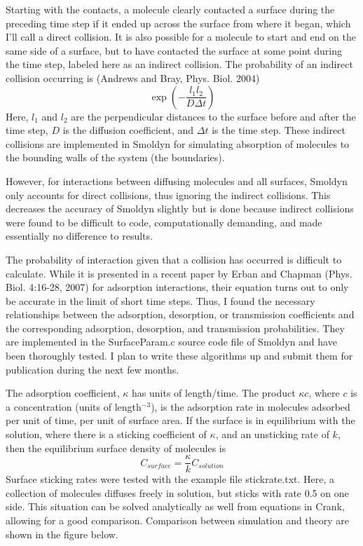 \documentclass {scrbook}
\begin{document}
Starting with the contacts, a molecule clearly contacted a surface during the preceding time step if it ended up across the surface from where it began, which I'll call a direct collision. It is also possible for a molecule to start and end on the same side of a surface, but to have contacted the surface at some point during the time step, labeled here as an indirect collision. The probability of an indirect collision occurring is (Andrews and Bray, Phys. Biol. 2004)
$$\exp\left({-\frac{l_1l_2}{D \Delta t}} \right)$$
Here, $l_1$ and $l_2$ are the perpendicular distances to the surface before and after the time step, $D$ is the diffusion coefficient, and $\Delta t$ is the time step. These indirect collisions are implemented in Smoldyn for simulating absorption of molecules to the bounding walls of the system (the boundaries).

However, for interactions between diffusing molecules and all surfaces, Smoldyn only accounts for direct collisions, thus ignoring the indirect collisions. This decreases the accuracy of Smoldyn slightly but is done because indirect collisions were found to be difficult to code, computationally demanding, and made essentially no difference to results.

The probability of interaction given that a collision has occurred is difficult to calculate. While it is presented in a recent paper by Erban and Chapman (Phys. Biol. 4:16-28, 2007) for adsorption interactions, their equation turns out to only be accurate in the limit of short time steps. Thus, I found the necessary relationships between the adsorption, desorption, or transmission coefficients and the corresponding adsorption, desorption, and transmission probabilities. They are implemented in the SurfaceParam.c source code file of Smoldyn and have been thoroughly tested. I plan to write these algorithms up and submit them for publication during the next few months.

The adsorption coefficient, $\kappa$ has units of length/time. The product $\kappa c$, where $c$ is a concentration (units of length$^{-3}$), is the adsorption rate in molecules adsorbed per unit of time, per unit of surface area. If the surface is in equilibrium with the solution, where there is a sticking coefficient of $\kappa$, and an unsticking rate of $k$, then the equilibrium surface density of molecules is
$$C_{surface} = \frac{\kappa}{k} C_{solution}$$
Surface sticking rates were tested with the example file stickrate.txt. Here, a collection of molecules diffuses freely in solution, but sticks with rate 0.5 on one side. This situation can be solved analytically as well from equations in Crank, allowing for a good comparison. Comparison between simulation and theory are shown in the figure below.
\end{document}
